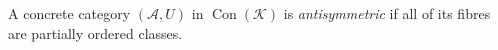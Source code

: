 A concrete category $(\mathcal{A}, U)$ in $\operatorname{Con}(\mathcal{K})$ is \textit{antisymmetric} if all of its fibres are partially ordered classes.
